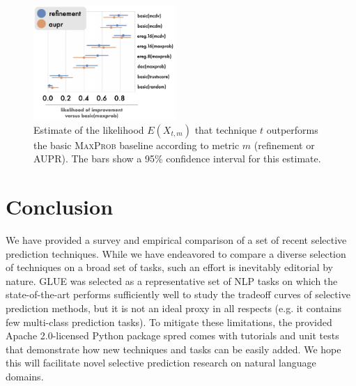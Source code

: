 \documentclass[11pt]{article}
\begin{document}
\begin{figure}[tb]
\centering
\includegraphics[width=0.48\textwidth]{pointplot2.png}
\caption{Estimate of the likelihood $E(X_{t,m})$ that technique $t$ outperforms the basic \textsc{MaxProb} baseline according to metric $m$ (refinement or \textsc{AUPR}). The bars show a 95\% confidence interval for this estimate.}\label{fig:auprpointplot}
\end{figure}




\section{Conclusion}

We have provided a survey and empirical comparison of a set of recent selective prediction techniques. While we have endeavored to compare a diverse selection of techniques on a broad set of tasks, such an effort is inevitably editorial by nature. GLUE was selected as a representative set of NLP tasks on which the state-of-the-art performs sufficiently well to study the tradeoff curves of selective prediction methods, but it is not an ideal proxy in all respects (e.g. it contains few multi-class prediction tasks). To mitigate these limitations, the provided Apache 2.0-licensed Python package \textsf{spred} comes with tutorials and unit tests that demonstrate how new techniques and tasks can be easily added. We hope this will facilitate novel selective prediction research on natural language domains.






\end{document}
